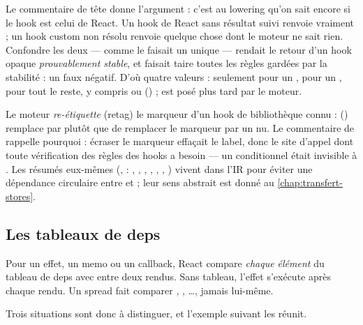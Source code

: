 \begin{decision}
Le commentaire de tête donne l'argument : c'est au lowering qu'on sait encore si le hook est celui de React. Un hook de React sans résultat suivi renvoie vraiment  ; un hook custom non résolu renvoie quelque chose dont le moteur ne sait rien. Confondre les deux --- comme le faisait un unique  --- rendait le retour d'un hook opaque \emph{prouvablement stable}, et faisait taire toutes les règles gardées par la stabilité : un faux négatif. D'où quatre valeurs :  seulement pour un ,  pour un ,  pour tout le reste, y compris  ou  () ;  est posé plus tard par le moteur.
\end{decision}

Le moteur \emph{re-étiquette} (\og retag\fg{}) le marqueur d'un hook de bibliothèque connu :  () remplace  par  plutôt que de remplacer le marqueur par un  nu. Le commentaire de  rappelle pourquoi : écraser le marqueur effaçait le label, donc le site d'appel dont toute vérification des règles des hooks a besoin --- un  conditionnel était invisible à . Les résumés eux-mêmes (,  : , , , , , , ) vivent dans l'IR pour éviter une dépendance circulaire entre  et  ; leur sens abstrait est donné au \cref{chap:transfert-stores}.

\subsection{Les tableaux de deps}
\label{sec:ir-deps}

\begin{react}
Pour un effet, un memo ou un callback, React compare \emph{chaque élément} du tableau de deps avec  entre deux rendus. Sans tableau, l'effet s'exécute après chaque rendu. Un spread \code{[...rows]} fait comparer , , \ldots, jamais  lui-même.
\end{react}

Trois situations sont donc à distinguer, et l'exemple suivant les réunit.

